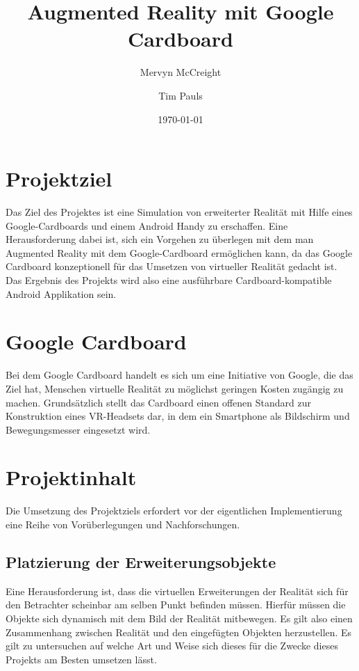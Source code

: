 \documentclass[a4paper]{scrartcl}
\title{Augmented Reality mit Google Cardboard}
\author{Mervyn McCreight \and Tim Pauls}
\date{\today}
\begin{document}
\maketitle

\section{Projektziel}
Das Ziel des Projektes ist eine Simulation von erweiterter Realität mit Hilfe eines Google-Cardboards und einem Android Handy zu erschaffen.
Eine Herausforderung dabei ist, sich ein Vorgehen zu überlegen mit dem man Augmented Reality mit dem Google-Cardboard ermöglichen kann,
da das Google Cardboard konzeptionell für das Umsetzen von virtueller Realität gedacht ist. Das Ergebnis des Projekts wird also eine ausführbare
Cardboard-kompatible Android Applikation sein.

\section{Google Cardboard}
Bei dem Google Cardboard handelt es sich um eine Initiative von Google, die das Ziel hat, Menschen virtuelle Realität zu möglichst geringen Kosten
zugängig zu machen. Grundsätzlich stellt das Cardboard einen offenen Standard zur Konstruktion eines VR-Headsets dar, in dem ein Smartphone als
Bildschirm und Bewegungsmesser eingesetzt wird.

\section{Projektinhalt}
Die Umsetzung des Projektziels erfordert vor der eigentlichen Implementierung eine Reihe von Vorüberlegungen und Nachforschungen.

\subsection{Platzierung der Erweiterungsobjekte}
Eine Herausforderung ist, dass die virtuellen Erweiterungen der Realität sich für den Betrachter scheinbar am selben Punkt befinden müssen.
Hierfür müssen die Objekte sich dynamisch mit dem Bild der Realität mitbewegen. Es gilt also einen Zusammenhang zwischen Realität und den eingefügten
Objekten herzustellen. Es gilt zu untersuchen auf welche Art und Weise sich dieses für die Zwecke dieses Projekts am Besten umsetzen lässt.
\end{document}

